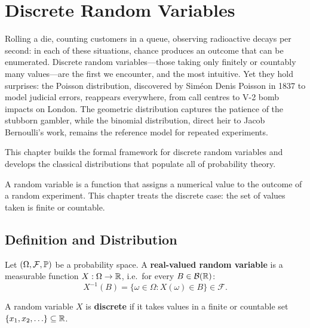 \chapter{Discrete Random Variables}
\label{ch:discrete}

Rolling a die, counting customers in a queue, observing radioactive decays per second: in each of these situations, chance produces an outcome that can be enumerated. Discrete random variables---those taking only finitely or countably many values---are the first we encounter, and the most intuitive. Yet they hold surprises: the Poisson distribution, discovered by Sim\'eon Denis Poisson in 1837 to model judicial errors, reappears everywhere, from call centres to V-2 bomb impacts on London. The geometric distribution captures the patience of the stubborn gambler, while the binomial distribution, direct heir to Jacob Bernoulli's work, remains the reference model for repeated experiments.

This chapter builds the formal framework for discrete random variables and develops the classical distributions that populate all of probability theory.

\begin{intuition}
A random variable is a function that assigns a numerical value to the outcome of
a random experiment. This chapter treats the discrete case: the set of values
taken is finite or countable.
\end{intuition}

\section{Definition and Distribution}

\begin{definition}
Let $(\Omega, \mathcal{F}, \mathbb{P})$ be a probability space. A \textbf{real-valued
random variable} is a measurable function $X : \Omega \to \mathbb{R}$, i.e.\ for every
$B \in \mathcal{B}(\mathbb{R})$:
\[
    X^{-1}(B) = \{\omega \in \Omega : X(\omega) \in B\} \in \mathcal{F}.
\]
\end{definition}

\begin{definition}
A random variable $X$ is \textbf{discrete} if it takes values in a finite or
countable set $\{x_1, x_2, \ldots\} \subseteq \mathbb{R}$.
\end{definition}

